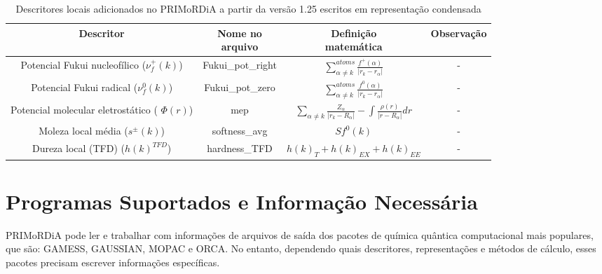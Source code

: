 \documentclass[a4paper,11pt]{refart}
\begin{document}
\hspace*{-\leftmarginwidth}
\begin{minipage}{\fullwidth}
	\begin{table}[H]
		\centering	
		\caption{Descritores locais adicionados no PRIMoRDiA a partir da versão 1.25 escritos em representação condensada}
		\begin{tabular}{c|c|c|c}
			\toprule
			Descritor &\makecell{Nome no\\ arquivo}&\makecell{Definição\\matemática}& Observação \\
			\midrule	
			\makecell{Potencial Fukui \\nucleofílico ($\nu_{f}^{+}(k)$)}  & Fukui\_pot\_right & $\sum_{\alpha \neq k }^{atoms} \frac{f^{+}(\alpha)}{|r_k - r_{\alpha}|}$ & - \\ \hline
			\makecell{Potencial Fukui \\radical ($\nu_{f}^{0}(k)$) }& Fukui\_pot\_zero & $\sum_{\alpha \neq k }^{atoms} \frac{f^{0}(\alpha)}{|r_k - r_{\alpha}|}$ & - \\ \hline
			\makecell{Potencial molecular\\ eletrostático ( $\Phi(r)$) } & mep & $\sum_{\alpha \neq k} \frac{Z_{\alpha}}{|r_k-R_{\alpha}|}  - \int \frac{\rho(r)}{|r-R_{\alpha}|} dr$  & - \\ \hline
			\makecell{Moleza local \\média ($s^{\pm}(k)$)}  & softness\_avg &  $Sf^{0}(k)$ &  - \\ \hline			
			\makecell{Dureza local\\ (TFD) ($h(k)^{TFD}$)} & hardness\_TFD & $h(k)_{T} + h(k)_{EX}+h(k)_{EE}$ & - \\
			\bottomrule
		\end{tabular} 
		\label{tab_local4}	
	\end{table}	
\end{minipage}


\newpage
\section{Programas Suportados e Informação Necessária}

PRIMoRDiA pode ler e trabalhar com informações de arquivos de saída dos pacotes de química quântica computacional mais populares, que são: GAMESS, GAUSSIAN, MOPAC e ORCA. No entanto, dependendo quais descritores, representações e métodos de cálculo, esses pacotes precisam escrever informações específicas. 
\end{document}
